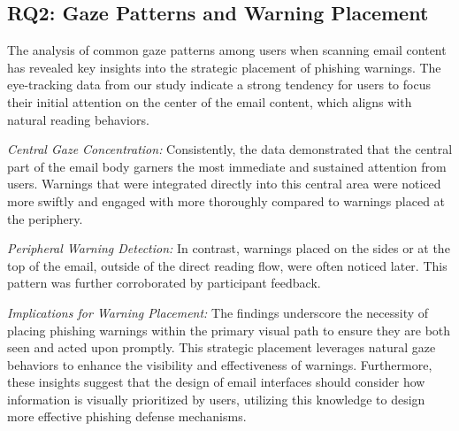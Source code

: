 \documentclass[
  a4paper,  %
  twoside,  %
  bibliography=totoc,
  headsepline,
  cleardoublepage=empty,
  parskip=half,
  draft=false
]{scrbook}
\begin{document}
\subsection{RQ2: Gaze Patterns and Warning Placement}
The analysis of common gaze patterns among users when scanning email content has revealed key insights into the strategic placement of phishing warnings. The eye-tracking data from our study indicate a strong tendency for users to focus their initial attention on the center of the email content, which aligns with natural reading behaviors.

\textit{Central Gaze Concentration:} Consistently, the data demonstrated that the central part of the email body garners the most immediate and sustained attention from users. Warnings that were integrated directly into this central area were noticed more swiftly and engaged with more thoroughly compared to warnings placed at the periphery. 

\textit{Peripheral Warning Detection:} In contrast, warnings placed on the sides or at the top of the email, outside of the direct reading flow, were often noticed later. This pattern was further corroborated by participant feedback.

\textit{Implications for Warning Placement:} The findings underscore the necessity of placing phishing warnings within the primary visual path to ensure they are both seen and acted upon promptly. This strategic placement leverages natural gaze behaviors to enhance the visibility and effectiveness of warnings. Furthermore, these insights suggest that the design of email interfaces should consider how information is visually prioritized by users, utilizing this knowledge to design more effective phishing defense mechanisms.
\end{document}
